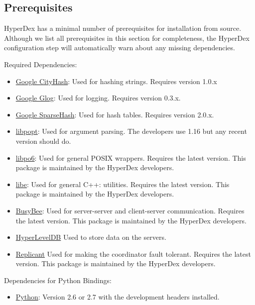 \subsection{Prerequisites}

HyperDex has a minimal number of prerequisites for installation from source.
Although we list all prerequisites in this section for completeness, the
HyperDex configuration step will automatically warn about any missing
dependencies.

Required Dependencies:

\begin{itemize}
\item \href{http://code.google.com/p/cityhash/}{Google CityHash}:  Used for
    hashing strings.  Requires version 1.0.x
\item \href{http://code.google.com/p/google-glog/}{Google Glog}:  Used for
    logging.  Requires version 0.3.x.
\item \href{https://code.google.com/p/sparsehash/}{Google SparseHash}:  Used for
    hash tables.  Requires version 2.0.x.
\item \href{http://rpm5.org/}{libpopt}: Used for argument parsing.  The
    developers use 1.16 but any recent version should do.
\item \href{http://hyperdex.org/downloads/}{libpo6}: Used for general POSIX
    wrappers.  Requires the latest version.  This package is maintained by the
    HyperDex developers.
\item \href{http://hyperdex.org/downloads/}{libe}: Used for general C++:
    utilities.  Requires the latest version.  This package is maintained by the
    HyperDex developers.
\item \href{http://hyperdex.org/downloads/}{BusyBee}: Used for server-server
    and client-server communication.  Requires the latest version.  This package
    is maintained by the HyperDex developers.
\item \href{http://hyperdex.org/downloads/}{HyperLevelDB}  Used to store data
    on the servers.
\item \href{http://hyperdex.org/downloads/}{Replicant} Used for making the
    coordinator fault tolerant.  Requires the latest version.  This package is
    maintained by the HyperDex developers.
\end{itemize}

Dependencies for Python Bindings:

\begin{itemize}
\item \href{http://python.org/}{Python}: Version 2.6 or 2.7 with the
    development headers installed.
\end{itemize}

